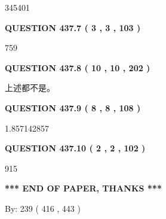 \documentclass{ctexart}
\begin{document}
  
 
 
\noindent{}

345401
 
 
  
\vspace{0.2in}
  
{\textbf{\Large{QUESTION
437.7 
 ( 3 , 3 , 103 )
}}}
  
  
 
 
\noindent{}

759
 
 
  
\vspace{0.2in}
  
{\textbf{\Large{QUESTION
437.8 
 ( 10 , 10 , 202 )
}}}
  
  
 
 
\noindent{}
 
 
 上述都不是。
 
 
 
 
  
\vspace{0.2in}
  
{\textbf{\Large{QUESTION
437.9 
 ( 8 , 8 , 108 )
}}}
  
  
 
 
\noindent{}

1.857142857
 
 
  
\vspace{0.2in}
  
{\textbf{\Large{QUESTION
437.10 
 ( 2 , 2 , 102 )
}}}
  
  
 
 
\noindent{}

915
 
 
   
   
 \vspace{0.2in}
 
   
   
   
   
\vspace{1.0in} 
{\textbf{\large{ *** END OF PAPER, THANKS *** }}} 
   
   
\hspace{1.0in} By: 
 239 ( 416 ,  443 )
   
\end{document}
